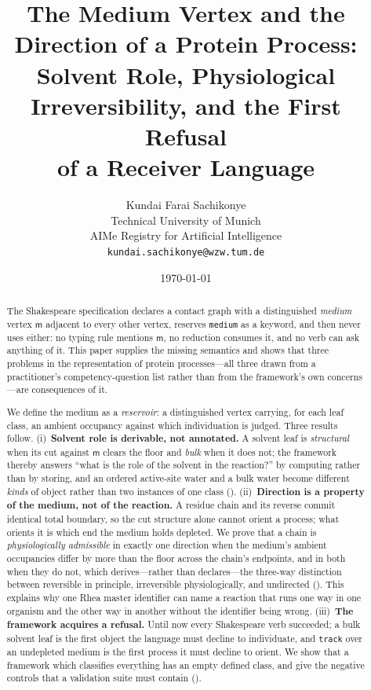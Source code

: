 \documentclass[11pt,twocolumn,a4paper]{article}
\title{\textbf{The Medium Vertex and the Direction of a Protein
Process:\\[3pt]
Solvent Role, Physiological Irreversibility, and the First Refusal\\
of a Receiver Language}}
\author{%
Kundai Farai Sachikonye\\
\small Technical University of Munich\\
\small AIMe Registry for Artificial Intelligence\\
\small \texttt{kundai.sachikonye@wzw.tum.de}}
\date{\today}
\theoremstyle{thmstyle}
\theoremstyle{definition}
\theoremstyle{remark}
\newcommand{\med}{\mathsf{m}}
\newcommand{\shk}[1]{\texttt{#1}}
\begin{document}
\maketitle

\begin{abstract}
\noindent
The Shakespeare specification declares a contact graph with a
distinguished \emph{medium} vertex $\med$ adjacent to every other vertex,
reserves \shk{medium} as a keyword, and then never uses either: no
typing rule mentions $\med$, no reduction consumes it, and no verb can
ask anything of it. This paper supplies the missing semantics and shows
that three problems in the representation of protein processes---all
three drawn from a practitioner's competency-question list rather than
from the framework's own concerns \citep{doerr2025limits}---are
consequences of it.

We define the medium as a \emph{reservoir}: a distinguished vertex
carrying, for each leaf class, an ambient occupancy against which
individuation is judged. Three results follow. (i)~\textbf{Solvent role
is derivable, not annotated.} A solvent leaf is \emph{structural} when
its cut against $\med$ clears the floor and \emph{bulk} when it does
not; the framework thereby answers ``what is the role of the solvent in
the reaction?'' by computing rather than by storing, and an ordered
active-site water and a bulk water become different \emph{kinds} of
object rather than two instances of one class ().
(ii)~\textbf{Direction is a property of the medium, not of the
reaction.} A residue chain and its reverse commit identical total
boundary, so the cut structure alone cannot orient a process; what
orients it is which end the medium holds depleted. We prove that a chain
is \emph{physiologically admissible} in exactly one direction when the
medium's ambient occupancies differ by more than the floor across the
chain's endpoints, and in both when they do not, which derives---rather
than declares---the three-way distinction between reversible in
principle, irreversible physiologically, and undirected
(). This explains why one Rhea master identifier can
name a reaction that runs one way in one organism and the other way in
another \citep{bansal2022rhea} without the identifier being wrong.
(iii)~\textbf{The framework acquires a refusal.} Until now every
Shakespeare verb succeeded; a bulk solvent leaf is the first object the
language must decline to individuate, and \shk{track} over an
undepleted medium is the first process it must decline to orient. We
show that a framework which classifies everything has an empty defined
class, and give the negative controls that a validation suite must
contain ().


\end{abstract}
\end{document}
